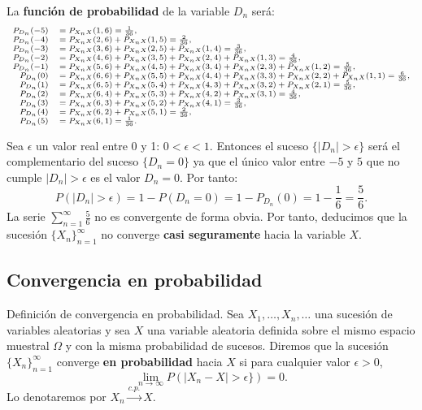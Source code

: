 \documentclass[
  letterpaper,
  DIV=11,
  numbers=noendperiod]{scrreprt}
\begin{document}
La \textbf{función de probabilidad} de la variable \(D_n\) será: \[
\scriptsize{
\begin{array}{rl}
P_{D_n}(-5) & =P_{X_nX}(1,6)=\frac{1}{36}, \\
P_{D_n}(-4) & =P_{X_nX}(2,6)+P_{X_nX}(1,5)=\frac{2}{36}, \\
P_{D_n}(-3) & =P_{X_nX}(3,6)+P_{X_nX}(2,5)+P_{X_nX}(1,4)=\frac{3}{36}, \\
P_{D_n}(-2) & =P_{X_nX}(4,6)+P_{X_nX}(3,5)+P_{X_nX}(2,4)+P_{X_nX}(1,3)=\frac{4}{36}, \\
P_{D_n}(-1) & =P_{X_nX}(5,6)+P_{X_nX}(4,5)+P_{X_nX}(3,4)+P_{X_nX}(2,3)+P_{X_nX}(1,2)=\frac{5}{36}, \\
P_{D_n}(0) & =P_{X_nX}(6,6)+P_{X_nX}(5,5)+P_{X_nX}(4,4)+P_{X_nX}(3,3)+P_{X_nX}(2,2)+P_{X_nX}(1,1)=\frac{6}{36}, \\
P_{D_n}(1) & =P_{X_nX}(6,5)+P_{X_nX}(5,4)+P_{X_nX}(4,3)+P_{X_nX}(3,2)+P_{X_nX}(2,1)=\frac{5}{36}, \\
P_{D_n}(2) & =P_{X_nX}(6,4)+P_{X_nX}(5,3)+P_{X_nX}(4,2)+P_{X_nX}(3,1)=\frac{4}{36}, \\
P_{D_n}(3) & =P_{X_nX}(6,3)+P_{X_nX}(5,2)+P_{X_nX}(4,1)=\frac{3}{36}, \\
P_{D_n}(4) & =P_{X_nX}(6,2)+P_{X_nX}(5,1)=\frac{2}{36}, \\
P_{D_n}(5) & =P_{X_nX}(6,1)=\frac{1}{36}.
\end{array}
}
\]

Sea \(\epsilon\) un valor real entre 0 y 1: \(0<\epsilon <1\). Entonces
el suceso \(\{|D_n|>\epsilon\}\) será el complementario del suceso
\(\{D_n=0\}\) ya que el único valor entre \(-5\) y \(5\) que no cumple
\(|D_n|>\epsilon\) es el valor \(D_n=0\). Por tanto: \[
P(|D_n|>\epsilon)=1-P(D_n=0)=1-P_{D_n}(0)=1-\frac{1}{6}=\frac{5}{6}.
\] La serie \(\sum\limits_{n=1}^\infty \frac{5}{6}\) no es convergente
de forma obvia. Por tanto, deducimos que la sucesión
\(\{X_n\}_{n=1}^\infty\) no converge \textbf{casi seguramente} hacia la
variable \(X\).

\hypertarget{convergencia-en-probabilidad}{%
\subsection{Convergencia en
probabilidad}\label{convergencia-en-probabilidad}}

Definición de convergencia en probabilidad. Sea
\(X_1,\ldots,X_n,\ldots\) una sucesión de variables aleatorias y sea
\(X\) una variable aleatoria definida sobre el mismo espacio muestral
\(\Omega\) y con la misma probabilidad de sucesos. Diremos que la
sucesión \(\{X_n\}_{n=1}^\infty\) converge \textbf{en probabilidad}
hacia \(X\) si para cualquier valor \(\epsilon >0\), \[
\lim_{n\to\infty} P(|X_n-X|>\epsilon \})=0.
\] Lo denotaremos por \(X_n\stackrel{c.p.}{\longrightarrow}X\).
\end{document}
